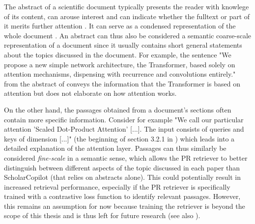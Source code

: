 The abstract of a scientific document typically presents the reader with knowlege of its content, can arouse interest and can indicate whether the fulltext or part of it merits further attention \cite{salager-meyer1990englishabstracts}. It can serve as a condensed representation of the whole document \cite{cross2006abstracts}. An abstract can thus also be considered a semantic coarse-scale representation of a document since it usually contains short general statements about the topics discussed in the document. For example, the sentence "We propose a new simple network architecture, the Transformer, based solely on attention mechanisms, dispensing with recurrence and convolutions entirely." from the abstract of \cite{vaswani2017attention} conveys the information that the Transformer is based on attention but does not elaborate on how attention works. 

On the other hand, the passages obtained from a document's sections often contain more specific information. Consider for example "We call our particular attention 'Scaled Dot-Product Attention' [...]. The input consists of queries and keys of dimension [...]" (the beginning of section 3.2.1 in \cite{vaswani2017attention}) which leads into a detailed explanation of the attention layer. Passages can thus similarly be considered \emph{fine-scale} in a semantic sense, which allows the PR retriever to better distinguish between different aspects of the topic discussed in each paper than ScholarCopilot (that relies on abstracts alone). This could potentially result in increased retrieval performance, especially if the PR retriever is specifically trained with a contrastive loss function to identify relevant passages. However, this remains an assumption for now because training the retriever is beyond the scope of this thesis and is thus left for future research (see also ).



